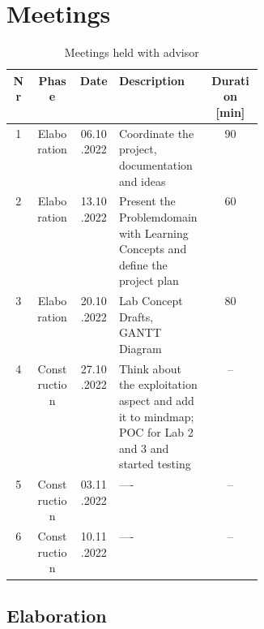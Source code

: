 \chapter{Meetings}
\label{meeting_chapter}

\begin{table}[H]
    \centering
    \begin{tabular}{| c | c | c | p{0.36\linewidth} | c |}
        \hline 
        Nr & Phase & Date & Description & Duration [min]\\
        \hline \hline
        1 & Elaboration & 06.10.2022 & Coordinate the project, documentation \- and ideas & 90\\
        \hline
        2 & Elaboration & 13.10.2022 & Present the Problemdomain with Learning Concepts and define the project plan & 60 \\
        \hline
        3 & Elaboration & 20.10.2022 & Lab Concept Drafts, GANTT Diagram & 80  \\
        \hline
        4 & Construction & 27.10.2022 & Think about the exploitation aspect and add it to mindmap; POC for Lab 2 and 3 and started testing & --\\
        \hline
        5 & Construction & 03.11.2022 & ---- & --\\
        \hline
        6 & Construction & 10.11.2022 & ---- & --\\
        \hline
    \end{tabular}
    \caption{Meetings held with advisor}
    \label{meetings_hold_table}
\end{table}
\section{Elaboration}
